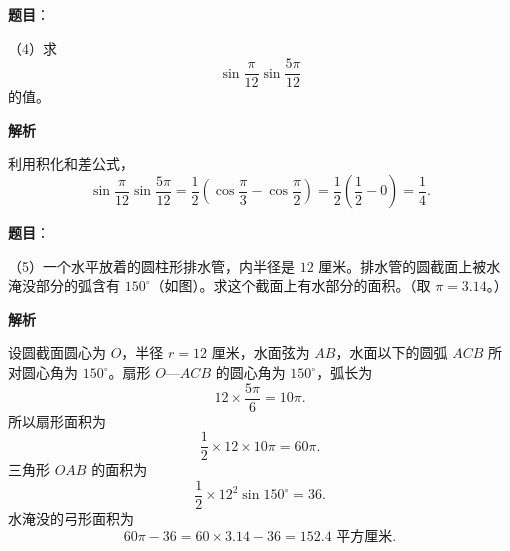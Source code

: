 \begin{answer}

\textbf{题目}：

（4）求
\nopagebreak[4]
\[
\sin\frac{\pi}{12}\sin\frac{5\pi}{12}
\]
的值。

\textbf{解析}

利用积化和差公式，
\nopagebreak[4]
\[
\sin\frac\pi{12}\sin\frac{5\pi}{12}
=\frac12\left(\cos\frac\pi3-\cos\frac\pi2\right)
=\frac12\left(\frac12-0\right)=\frac14.
\]


\end{answer}
\begin{answer}

\textbf{题目}：

（5）一个水平放着的圆柱形排水管，内半径是 $12$ 厘米。排水管的圆截面上被水淹没部分的弧含有 $150^\circ$（如图）。求这个截面上有水部分的面积。（取 $\pi=3.14$。）
\nopagebreak[4]
\begin{center}\end{center}
\nopagebreak[4]
\textbf{解析}

设圆截面圆心为 $O$，半径 $r=12$ 厘米，水面弦为 $AB$，水面以下的圆弧 $ACB$ 所对圆心角为 $150^\circ$。扇形 $O$—$ACB$ 的圆心角为 $150^\circ$，弧长为
\nopagebreak[4]
\[
12\times\frac{5\pi}{6}=10\pi.
\]
所以扇形面积为
\nopagebreak[4]
\[
\frac12\times12\times10\pi=60\pi.
\]
三角形 $OAB$ 的面积为
\nopagebreak[4]
\[
\frac12\times12^2\sin150^\circ=36.
\]
水淹没的弓形面积为
\nopagebreak[4]
\[
60\pi-36=60\times3.14-36=152.4\text{ 平方厘米}.
\]


\end{answer}
